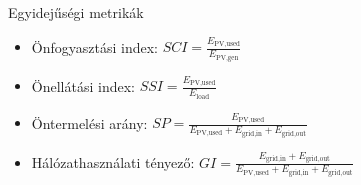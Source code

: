 \documentclass[aspectratio=169]{beamer}
\begin{document}
\begin{frame}{Egyidejűségi metrikák}
\begin{minipage}{0.55\columnwidth}
\begin{center}
\end{center}
\end{minipage}
\hspace{-2.5em}
\begin{minipage}[t]{0.5\columnwidth}
\vspace{-10ex}
{
\footnotesize
\begin{itemize}
        \item Önfogyasztási index: $SCI = \frac{E_{\text{PV,used}}}{E_{\text{PV,gen}}}$
        \item Önellátási index: $SSI = \frac{E_{\text{PV,used}}}{E_{\text{load}}}$
        \item Öntermelési arány: $SP = \frac{E_{\text{PV,used}}}{E_{\text{PV,used}}+E_{\text{grid,in}}+E_{\text{grid,out}}}$
        \item Hálózathasználati tényező: $GI = \frac{E_{\text{grid,in}} + E_{\text{grid,out}}}{E_{\text{PV,used}}+E_{\text{grid,in}}+E_{\text{grid,out}}}$
    \end{itemize}
    }
\end{minipage}
\end{frame}
\end{document}
